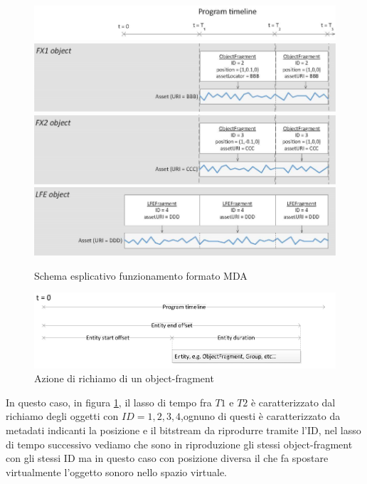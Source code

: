 \documentclass[12pt,a4paper]{report}
\begin{document}
\begin{figure}[htbp]
	\centering
	\includegraphics[scale=0.50]{figures/timeline.png}\\
	\includegraphics[scale=0.50]{figures/object1.png}\\
	\includegraphics[scale=0.50]{figures/object2.png}\\
	\includegraphics[scale=0.50]{figures/object3.png}
	\caption {Schema esplicativo funzionamento formato MDA}
	\label{fig:object}
	\end{figure}

\begin{figure}[htbp]
	\centering
	\includegraphics[scale=0.50]{figures/timeline2.png}
	\caption {Azione di richiamo di un object-fragment}
	\label{fig:time}
	\end{figure}

In questo caso, in figura \ref{fig:object}, il lasso di tempo fra $T1$ e $T2$ è caratterizzato dal richiamo degli oggetti con $ID=1,2,3,4$,ognuno di questi è caratterizzato da metadati indicanti la posizione e il bitstream da riprodurre tramite l'ID, nel lasso di tempo successivo vediamo che sono in riproduzione gli stessi object-fragment con gli stessi ID ma in questo caso con posizione diversa il che fa spostare virtualmente l'oggetto sonoro nello spazio virtuale.
\end{document}
